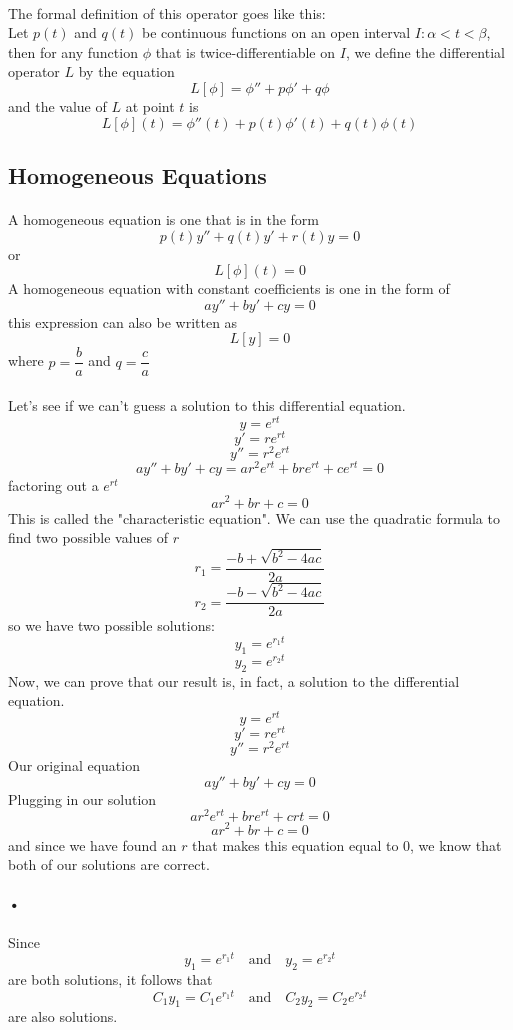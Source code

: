 \documentclass[font =22]{report}
\begin{document}
\paragraph{}
The formal definition of this operator goes like this:\\
Let $p(t)$ and $q(t)$ be continuous functions on an open interval $I: \alpha<t<\beta $, then for any function $\phi$ that is twice-differentiable on $I$, we define the differential operator $L$ by the equation 
\[
L[\phi] = \phi'' + p\phi' +q\phi
\] 
and the value of $L$ at point $t$ is 
\[
L[\phi](t) = \phi''(t) + p(t)\phi'(t) +q(t)\phi(t)
\]

\subsection{Homogeneous Equations}
\paragraph{}
A homogeneous equation is one that is in the form 
\[
p(t)y''+q(t)y'+r(t)y =0
\]
or
\[
L[\phi](t) = 0
\]
A homogeneous equation with constant coefficients is one in the form of 
\[
ay''+by'+cy = 0
\]
 this expression can also be written as 
\[
L[y] = 0
\]
where $p = \dfrac{b}{a}$ and $q = \dfrac{c}{a}$\\
\paragraph{}
Let's see if we can't guess a solution to this differential equation.
\[
y = e^{rt}
\]
\[
y' = re^{rt}
\]
\[
y'' = r^2e^{rt}
\]
\[
ay''+by'+cy = ar^2e^{rt}+bre^{rt} +ce^{rt} = 0
\]
factoring out a $e^{rt}$
\[
ar^2+br + c = 0
\]
This is called the "characteristic equation". We can use the quadratic formula to find two possible values of $r$
\[
r_1 = \frac{-b + \sqrt{b^2-4ac}}{2a}
\]
\[
r_2 = \frac{-b - \sqrt{b^2-4ac}}{2a}
\]
so we have two possible solutions:
\[
y_1 =  e^{r_1t}
\]
\[
y_2 = e^{r_2t}
\]
Now, we can prove that our result is, in fact, a solution to the differential equation.
\[
y = e^{rt}
\]
\[
y' = re^{rt}
\]
\[
y'' = r^2e^{rt}
\]
Our original equation
\[
ay''+by'+cy = 0
\]
Plugging in our solution
\[
ar^2e^{rt} +bre^{rt}+c{rt} = 0
\]
\[
ar^2 + br+ c = 0
\]
and since we have found an $r$ that makes this equation equal to $0$, we know that both of our solutions are correct.\\
\paragraph{•}
Since 
\[
y_1 =  e^{r_1t}\quad \text{and} \quad y_2 = e^{r_2t}
\]
are both solutions, it follows that 
\[
C_1y_1 =  C_1e^{r_1t}\quad \text{and} \quad C_2y_2 = C_2e^{r_2t}
\]
are also solutions.
\end{document}
